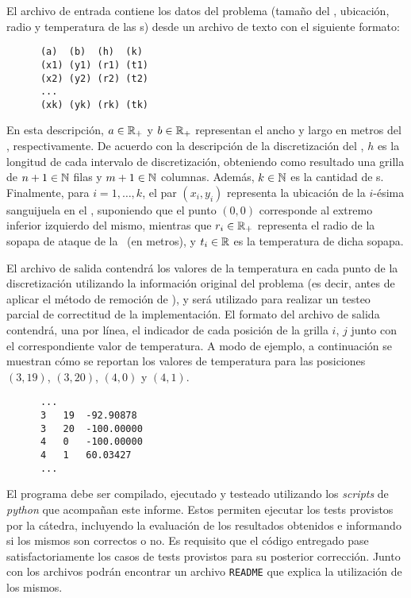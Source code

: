 El archivo de entrada contiene los datos del problema (tama\~no del \objeto, ubicaci\'on, radio y temperatura de las \atacante s) desde un archivo de texto con el siguiente formato:

\begin{verbatim}
      (a)  (b)  (h)  (k)
      (x1) (y1) (r1) (t1)
      (x2) (y2) (r2) (t2)
      ...
      (xk) (yk) (rk) (tk)
\end{verbatim}

En esta descripci\'on, $a\in\mathbb{R}_+$ y $b\in\mathbb{R}_+$ representan el ancho
y largo en metros del \objeto, respectivamente. De acuerdo con la descripci\'on
de la discretizaci\'on del \objeto, $h$ es la longitud de cada intervalo de discretizaci\'on,
obteniendo como resultado una grilla de $n+1\in\mathbb{N}$ filas y $m+1\in\mathbb{N}$ columnas. Adem\'as, $k\in\mathbb{N}$ es la cantidad de \atacante s.
Finalmente, para $i=1,\dots,k$, el par $(x_i,y_i)$ representa la ubicaci\'on de la $i$-\'esima sanguijuela en el \objeto, suponiendo que el punto $(0,0)$  corresponde al extremo inferior izquierdo del mismo, mientras que $r_i\in\mathbb{R}_+$ representa el radio de la sopapa de ataque de la \atacante\ (en metros), y $t_i\in\mathbb{R}$ es la temperatura de dicha sopapa.

El archivo de salida contendr\'a los valores de la temperatura en cada punto de la discretizaci\'on utilizando la informaci\'on original del problema (es decir, antes de aplicar el m\'etodo de remoci\'on de \atacante), y ser\'a utilizado para realizar un testeo parcial de correctitud de la implementaci\'on. El formato del archivo de salida contendr\'a, una por l\'inea, el indicador de cada posici\'on de la grilla $i$, $j$ junto con el correspondiente valor de temperatura. A modo de ejemplo, a continuaci\'on se muestran c\'omo se reportan los valores de temperatura para las posiciones $(3,19)$, $(3,20)$, $(4,0)$ y $(4,1)$. 

\begin{verbatim}
      ...
      3   19  -92.90878
      3   20  -100.00000
      4   0   -100.00000
      4   1   60.03427
      ...
\end{verbatim}

El programa debe ser compilado, ejecutado y testeado utilizando los \emph{scripts} de \emph{python} que acompa\~nan este informe. Estos permiten ejecutar los tests provistos por la c\'atedra, incluyendo la evaluaci\'on de los resultados obtenidos e informando si los mismos son correctos o no. Es requisito que el c\'odigo entregado pase satisfactoriamente los casos de tests provistos para su posterior correcci\'on. Junto con los archivos podr\'an encontrar un archivo \texttt{README} que explica la utilizaci\'on de los mismos.

